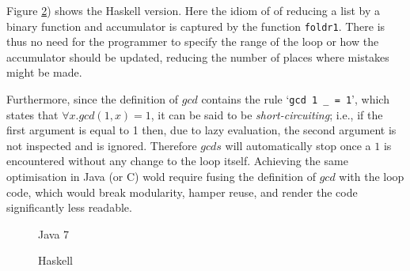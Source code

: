 Figure \ref{fig:gcds:haskell}) shows the Haskell version. Here the idiom
of of reducing a list by a binary function and accumulator is captured
by the function \lstinline|foldr1|. There is thus no need for the programmer
to specify the range of the loop or how the accumulator should be updated,
reducing the number of places where mistakes might be made.

Furthermore, since the definition of $gcd$ contains the rule
`\lstinline|gcd 1 _ = 1|',
which states that $\forall x. gcd (1, x) = 1$, it can be said to be
\emph{short-circuiting}; i.e., if the first argument is equal to 1 then, due
to lazy evaluation, the second argument is not inspected and is ignored.
Therefore $gcds$ will automatically stop once a $1$ is encountered without any
change to the loop itself. Achieving the same optimisation in Java (or C) wold
require fusing the definition of $gcd$ with the loop code, which would break
modularity, hamper reuse, and render the code significantly less readable.

% 

\begin{figure}

\caption{Java 7}
\label{fig:gcds:java}
\end{figure}

\begin{figure}

\caption{Haskell}
\label{fig:gcds:haskell}
\end{figure}





